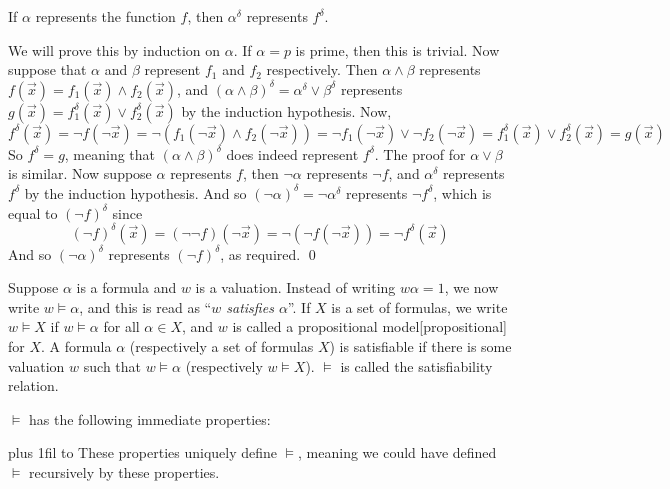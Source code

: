 \bthrm[title=The Duality Principle for Two-Valued Logic, name=dualityprinciple]

    If $\alpha$ represents the function $f$, then $\alpha^\delta$ represents $f^\delta$.

\ethrm

We will prove this by induction on $\alpha$.
If $\alpha=p$ is prime, then this is trivial.
Now suppose that $\alpha$ and $\beta$ represent $f_1$ and $f_2$ respectively.
Then $\alpha\land\beta$ represents $f(\vec x)=f_1(\vec x)\land f_2(\vec x)$, and $(\alpha\land\beta)^\delta=\alpha^\delta\lor\beta^\delta$ represents $g(\vec x)=f_1^\delta(\vec x)\lor f_2^\delta(\vec x)$
by the induction hypothesis.
Now,
$$ f^\delta(\vec x) = \neg f(\neg\vec x) = \neg(f_1(\neg\vec x)\land f_2(\neg\vec x)) = \neg f_1(\neg\vec x)\lor\neg f_2(\neg\vec x) = f_1^\delta(\vec x)\lor f_2^\delta(\vec x) = g(\vec x) $$
So $f^\delta=g$, meaning that $(\alpha\land\beta)^\delta$ does indeed represent $f^\delta$.
The proof for $\alpha\lor\beta$ is similar.
Now suppose $\alpha$ represents $f$, then $\neg\alpha$ represents $\neg f$, and $\alpha^\delta$ represents $f^\delta$ by the induction hypothesis.
And so $(\neg\alpha)^\delta=\neg\alpha^\delta$ represents $\neg f^\delta$, which is equal to $(\neg f)^\delta$ since
$$ (\neg f)^\delta(\vec x) = (\neg\neg f)(\neg\vec x) = \neg(\neg f(\neg\vec x)) = \neg f^\delta(\vec x) $$
And so $(\neg\alpha)^\delta$ represents $(\neg f)^\delta$, as required.
\qed

\bdefn

    Suppose $\alpha$ is a formula and $w$ is a valuation.
    Instead of writing $w\alpha=1$, we now write $w\vDash\alpha$, and this is read as ``{\it $w$ satisfies $\alpha$}''.
    If $X$ is a set of formulas, we write $w\vDash X$ if $w\vDash\alpha$ for all $\alpha\in X$, and $w$ is called a {\emphcolor propositional model}[propositional] for $X$.
    A formula $\alpha$ (respectively a set of formulas $X$) is {\emphcolor satisfiable} if there is some valuation $w$ such that $w\vDash\alpha$ (respectively $w\vDash X$).
    $\vDash$ is called the {\emphcolor satisfiability relation}.

\edefn

$\vDash$ has the following immediate properties:

\medskip
\tabskip=0pt plus 1fil
\halign to 
\medskip
These properties uniquely define $\vDash$, meaning we could have defined $\vDash$ recursively by these properties.


